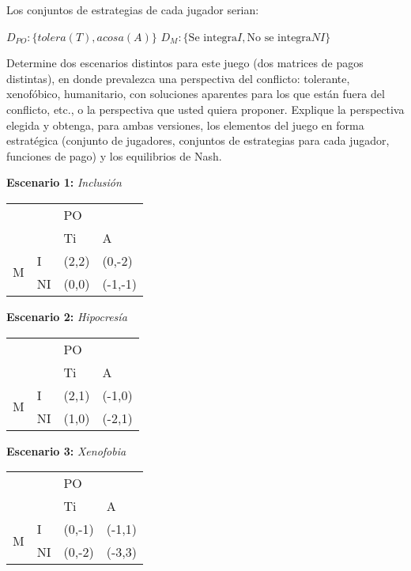 \documentclass{homework}
\begin{document}
Los conjuntos de estrategias de cada jugador serian: 

$D_{PO}: \{ tolera (T), acosa (A)\}$
$D_M : \{ \text{Se integra} I, \text{No se integra} NI \}$

Determine dos escenarios distintos para este juego (dos matrices de pagos distintas), en donde
prevalezca una perspectiva del conflicto: tolerante, xenofóbico, humanitario, con soluciones
aparentes para los que están fuera del conflicto, etc., o la perspectiva que usted quiera proponer.
Explique la perspectiva elegida y obtenga, para ambas versiones, los elementos del juego en forma
estratégica (conjunto de jugadores, conjuntos de estrategias para cada jugador, funciones de pago)
y los equilibrios de Nash.


    \textbf{Escenario 1:} \emph{Inclusión}

\begin{table}[h!]
\begin{tabular}{|ll|ll|}
\hline
\multicolumn{2}{|l|}{\multirow{2}{*}{}} & \multicolumn{2}{l|}{PO} \\ \cline{3-4} 
\multicolumn{2}{|l|}{} & \multicolumn{1}{l|}{Ti} & A \\ \hline
\multicolumn{1}{|c|}{\multirow{2}{*}{M}} & I & \multicolumn{1}{l|}{(2,2)} & (0,-2) \\ \cline{2-4} 
\multicolumn{1}{|c|}{} & NI & \multicolumn{1}{l|}{(0,0)} & (-1,-1) \\ \hline
\end{tabular}
\end{table}


    \textbf{Escenario 2:} \emph{Hipocresía }

    
\begin{table}[h!]
\begin{tabular}{|ll|ll|}
\hline
\multicolumn{2}{|l|}{\multirow{2}{*}{}} & \multicolumn{2}{l|}{PO} \\ \cline{3-4} 
\multicolumn{2}{|l|}{} & \multicolumn{1}{l|}{Ti} & A \\ \hline
\multicolumn{1}{|c|}{\multirow{2}{*}{M}} & I & \multicolumn{1}{l|}{(2,1)} & (-1,0) \\ \cline{2-4} 
\multicolumn{1}{|c|}{} & NI & \multicolumn{1}{l|}{(1,0)} & (-2,1) \\ \hline

\end{tabular}
\end{table}



    \textbf{Escenario 3:} \emph{Xenofobia}
\begin{table}[h!]
\begin{tabular}{|ll|ll|}
\hline
\multicolumn{2}{|l|}{\multirow{2}{*}{}} & \multicolumn{2}{l|}{PO} \\ \cline{3-4} 
\multicolumn{2}{|l|}{} & \multicolumn{1}{l|}{Ti} & A \\ \hline
\multicolumn{1}{|c|}{\multirow{2}{*}{M}} & I & \multicolumn{1}{l|}{(0,-1)} & (-1,1) \\ \cline{2-4} 
\multicolumn{1}{|c|}{} & NI & \multicolumn{1}{l|}{(0,-2)} & (-3,3) \\ \hline
\end{tabular}
\end{table}
\end{document}
